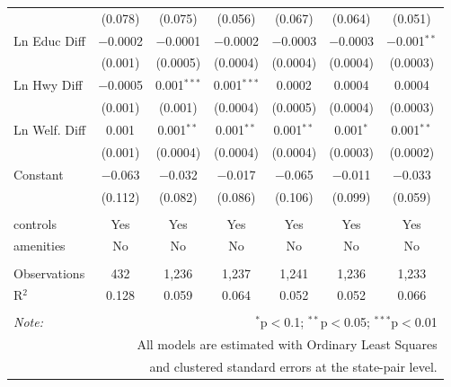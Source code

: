 \begin{table}[!htbp]
\begin{tabular}{@{\extracolsep{5pt}}lcccccc}
  & (0.078) & (0.075) & (0.056) & (0.067) & (0.064) & (0.051) \\ 
  Ln Educ Diff & $-$0.0002 & $-$0.0001 & $-$0.0002 & $-$0.0003 & $-$0.0003 & $-$0.001$^{**}$ \\ 
  & (0.001) & (0.0005) & (0.0004) & (0.0004) & (0.0004) & (0.0003) \\ 
  Ln Hwy Diff & $-$0.0005 & 0.001$^{***}$ & 0.001$^{***}$ & 0.0002 & 0.0004 & 0.0004 \\ 
  & (0.001) & (0.001) & (0.0004) & (0.0005) & (0.0004) & (0.0003) \\ 
  Ln Welf. Diff & 0.001 & 0.001$^{**}$ & 0.001$^{**}$ & 0.001$^{**}$ & 0.001$^{*}$ & 0.001$^{**}$ \\ 
  & (0.001) & (0.0004) & (0.0004) & (0.0004) & (0.0003) & (0.0002) \\ 
  Constant & $-$0.063 & $-$0.032 & $-$0.017 & $-$0.065 & $-$0.011 & $-$0.033 \\ 
  & (0.112) & (0.082) & (0.086) & (0.106) & (0.099) & (0.059) \\ 
 \hline \\[-1.8ex] 
controls & Yes & Yes & Yes & Yes & Yes & Yes \\ 
amenities & No & No & No & No & No & No \\ 
\hline \\[-1.8ex] 
Observations & 432 & 1,236 & 1,237 & 1,241 & 1,236 & 1,233 \\ 
R$^{2}$ & 0.128 & 0.059 & 0.064 & 0.052 & 0.052 & 0.066 \\ 
\hline 
\hline \\[-1.8ex] 
\textit{Note:}  & \multicolumn{6}{r}{$^{*}$p$<$0.1; $^{**}$p$<$0.05; $^{***}$p$<$0.01} \\ 
 & \multicolumn{6}{r}{All models are estimated with Ordinary Least Squares} \\ 
 & \multicolumn{6}{r}{and clustered standard errors at the state-pair level.} \\ 
\end{tabular} 
\end{table} 
